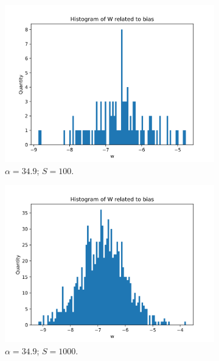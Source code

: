 \documentclass{article}
\begin{document}
\begin{figure}
\begin{subfigure}[t]{0.24\textwidth}
    \includegraphics[width=\linewidth]{hist_featbias_349000000_sample_100.png}
    \caption{$\alpha = 34.9$; $S = 100$.}
  \end{subfigure}
  \hfill
  \begin{subfigure}[t]{0.24\textwidth}
    \centering
    \includegraphics[width=\linewidth]{hist_featbias_349000000_sample_1000.png}
    \caption{$\alpha = 34.9$; $S = 1000$.}
  \end{subfigure}
  \hfill
  \begin{subfigure}[t]{0.24\textwidth}
    \centering

\end{subfigure}
\end{figure}
\end{document}
